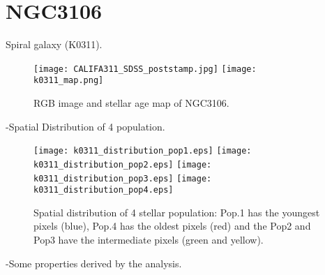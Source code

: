 \newpage
\section*{NGC3106}
Spiral galaxy (K0311).

\begin{figure}[bh]
\begin{center}
\texttt{[image: CALIFA311\_SDSS\_poststamp.jpg]}
\texttt{[image: k0311\_map.png]}
\caption{RGB image and stellar age map of NGC3106.}
   \label{fig1}
\end{center}
\end{figure}

-Spatial Distribution of 4 population.

\begin{figure}[bh]
\begin{center}
\texttt{[image: k0311\_distribution\_pop1.eps]}
\texttt{[image: k0311\_distribution\_pop2.eps]}
\texttt{[image: k0311\_distribution\_pop3.eps]}
\texttt{[image: k0311\_distribution\_pop4.eps]}
 \caption{Spatial distribution of 4 stellar population: Pop.1 has the youngest pixels (blue), Pop.4 has the oldest pixels (red) and the Pop2 and Pop3 have the intermediate pixels (green and yellow).}
   \label{fig1}
\end{center}
\end{figure}


-Some properties derived by the analysis.


